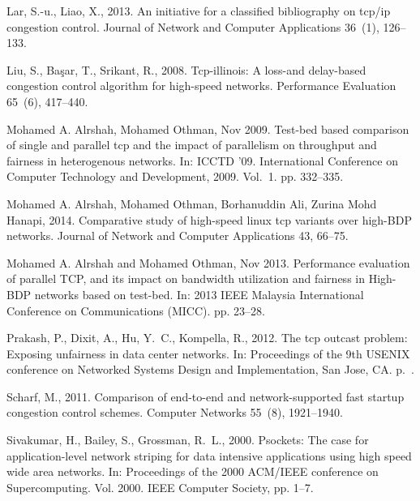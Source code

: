 \documentclass[preprint,3p,times,twocolumn,authoryear]{elsarticle}
\begin{document}
\begin{thebibliography}{46}
Lar, S.-u., Liao, X., 2013. An initiative for a classified bibliography on
  tcp/ip congestion control. Journal of Network and Computer Applications
  36~(1), 126--133.

Liu, S., Ba{\c{s}}ar, T., Srikant, R., 2008. Tcp-illinois: A loss-and
  delay-based congestion control algorithm for high-speed networks. Performance
  Evaluation 65~(6), 417--440.

{Mohamed A. Alrshah}, {Mohamed Othman}, Nov 2009. Test-bed based comparison of
  single and parallel tcp and the impact of parallelism on throughput and
  fairness in heterogenous networks. In: ICCTD '09. International Conference on
  Computer Technology and Development, 2009. Vol.~1. pp. 332--335.

{Mohamed A. Alrshah}, {Mohamed Othman}, {Borhanuddin Ali}, {Zurina Mohd
  Hanapi}, 2014. Comparative study of high-speed linux tcp variants over
  high-{BDP} networks. Journal of Network and Computer Applications 43, 66--75.

{Mohamed A. Alrshah and Mohamed Othman}, Nov 2013. Performance evaluation of
  parallel {TCP}, and its impact on bandwidth utilization and fairness in
  {High-BDP} networks based on test-bed. In: 2013 IEEE Malaysia International
  Conference on Communications (MICC). pp. 23--28.

Prakash, P., Dixit, A., Hu, Y.~C., Kompella, R., 2012. The tcp outcast problem:
  Exposing unfairness in data center networks. In: Proceedings of the 9th
  USENIX conference on Networked Systems Design and Implementation, San Jose,
  CA. p.~.

Scharf, M., 2011. {Comparison of end-to-end and network-supported fast startup
  congestion control schemes}. Computer Networks 55~(8), 1921--1940.

Sivakumar, H., Bailey, S., Grossman, R.~L., 2000. Psockets: The case for
  application-level network striping for data intensive applications using high
  speed wide area networks. In: Proceedings of the 2000 ACM/IEEE conference on
  Supercomputing. Vol. 2000. IEEE Computer Society, pp. 1--7.


\end{thebibliography}
\end{document}
